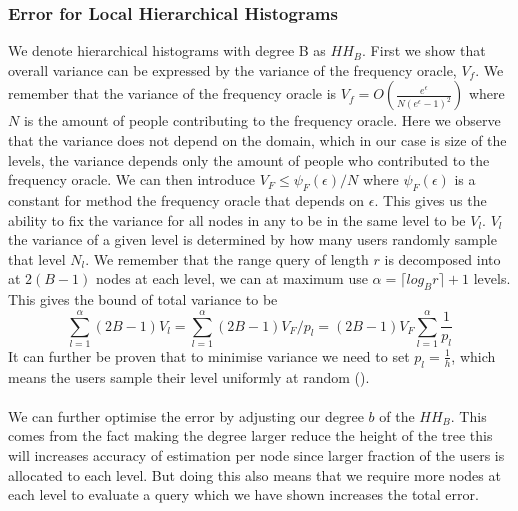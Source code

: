 \documentclass[11pt]{article}
\theoremstyle{definition}
\begin{document}
\subsubsection{Error for Local Hierarchical Histograms}
We denote hierarchical histograms with degree B as $HH_B$. First we show that overall variance can be expressed by the variance of the frequency oracle, $V_f$.  We remember that the variance of the frequency oracle is $V_f= O\left(\frac{e^{\epsilon}}{N\left(e^{\epsilon}-1\right)^{2}}\right)$ where $N$ is the amount of people contributing to the frequency oracle. Here we observe that the variance does not depend on the domain, which in our case is size of the levels, the variance depends only the amount of people who contributed to the frequency oracle. We can then introduce $V_F\leq\psi_F(\epsilon)/N$ where $\psi_F(\epsilon)$ is a constant for method the frequency oracle that depends on $\epsilon$. This gives us the ability to fix the variance for all nodes in any to be in the same level to be $V_l$. $V_l$ the variance of a given level is determined by how many users randomly sample that level $N_l$. We remember that the range query of length $r$ is decomposed into at $2(B-1)$ nodes at each level, we can at maximum use $\alpha=\lceil log_B r\rceil+1$ levels. This gives the bound of total variance to be \[\sum_{l=1}^{\alpha}(2 B-1) V_{l}=\sum_{l=1}^{\alpha}(2 B-1) V_{F} / p_{l}=(2 B-1) V_{F} \sum_{l=1}^{\alpha} \frac{1}{p_{l}}\]
It can further be proven that to minimise variance we need to set $p_{l}=\frac{1}{h}$, which means the users sample their level uniformly at random (\cite[5]{local}). \\ \\

\noindent We can further optimise the error by adjusting our degree $b$ of the $HH_B$. This comes from the fact making the degree larger reduce the height of the tree this will increases accuracy of estimation per node since larger fraction of the users is allocated to each level. But doing this also means that we require more nodes at each level to evaluate a query which we have shown increases the total error. 
\end{document}
